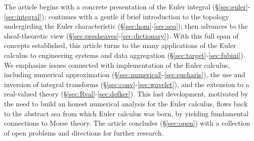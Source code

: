 \documentclass{psapm-l}
\theoremstyle{definition}
\theoremstyle{remark}
\numberwithin{equation}{section}
\begin{document}
The article begins with a concrete presentation of the Euler integral (\S\ref{sec:euler}-\ref{sec:integral}); continues with a gentle if brief introduction to the topology undergirding the Euler characteristic (\S\ref{sec:hom}-\ref{sec:seq}); then advances to the sheaf-theoretic view (\S\ref{sec:presheaves}-\ref{sec:dictionary}). With this full span of concepts established, this article turns to the many applications of the Euler calculus to engineering systems and data aggregation (\S\ref{sec:target}-\ref{sec:fubini}). We emphasize issues connected with implementation of the Euler calculus, including numerical approximation (\S\ref{sec:numerical}-\ref{sec:eucharis}), the use and inversion of integral transforms (\S\ref{sec:conv}-\ref{sec:wavelet}), and the extension to a real-valued theory (\S\ref{sec:Rval}-\ref{sec:defker}). This last development, motivated by the need to build an honest numerical analysis for the Euler calculus, flows back to the abstract sea from which Euler calculus was born, by yielding fundamental connections to Morse theory. The article concludes (\S\ref{sec:open}) with a collection of open problems and directions for further research.
\end{document}
